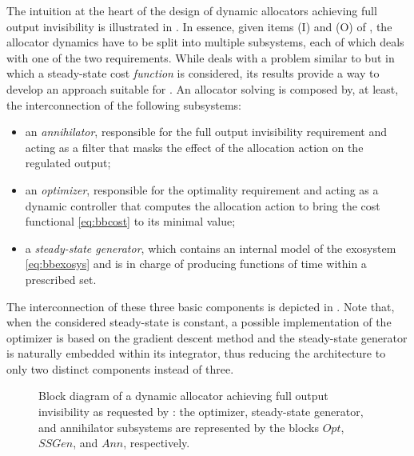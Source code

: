 The intuition at the heart of the design of dynamic allocators achieving full output invisibility is illustrated in \cite{cristofaro_output_2014}. In essence, given items (I) and (O) of , the allocator dynamics have to be split into multiple subsystems, each of which deals with one of the two requirements. While \cite{cristofaro_output_2014} deals with a problem similar to  but in which a steady-state cost \emph{function} is considered, its results provide a way to develop an approach suitable for . An allocator solving  is composed by, at least, the interconnection of the following subsystems:
\begin{itemize}
  \item an \emph{annihilator}, responsible for the full output invisibility requirement and acting as a filter that masks the effect of the allocation action on the regulated output;
  \item an \emph{optimizer}, responsible for the optimality requirement and acting as a dynamic controller that computes the allocation action to bring the cost functional \eqref{eq:bbcost} to its minimal value;
  \item a \emph{steady-state generator}, which contains an internal model of the exosystem \eqref{eq:bbexosys} and is in charge of producing functions of time within a prescribed set.
\end{itemize}
The interconnection of these three basic components is depicted in . Note that, when the considered steady-state is constant, a possible implementation of the optimizer is based on the gradient descent method \cite{khalil_nonlinear_2002} and the steady-state generator is naturally embedded within its integrator, thus reducing the architecture to only two distinct components instead of three.
\begin{figure}
  \centering
  
  \caption{Block diagram of a dynamic allocator achieving full output invisibility as requested by : the optimizer, steady-state generator, and annihilator subsystems are represented by the blocks $Opt$, $SSGen$, and $Ann$, respectively.}
  \label{fig:fullallocator}
\end{figure}

